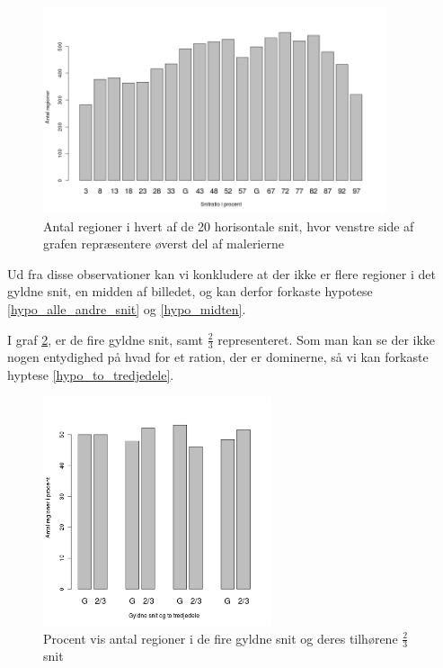 \begin{figure}[h!]
	\begin{center}
		\includegraphics[width=0.9\textwidth]{afsnit/resultater/billeder/cut2cut3eatsperratioU.png}
	\end{center}
	\caption{Antal regioner i hvert af de 20 horisontale snit, hvor venstre side af grafen repræsentere øverst del af malerierne}
	\label{antal_regioner_horisontale_cut_udvidet}
\end{figure}

Ud fra disse observationer kan vi konkludere at der ikke er flere
regioner i det gyldne snit, en midden af billedet, og kan derfor
forkaste hypotese \ref{hypo_alle_andre_snit} og \ref{hypo_midten}.

I graf \ref{G_vs_to_trejedele_udvidet}, er de fire gyldne snit, samt
$\frac{2}{3}$ representeret. Som man kan se der ikke nogen entydighed på
hvad for et ration, der er dominerne, så vi kan forkaste hyptese
\ref{hypo_to_tredjedele}.

\begin{figure}[h!]
	\begin{center}
		\includegraphics[width=0.6\textwidth]{afsnit/resultater/billeder/G_vs_to_tredjedeleU.png}
	\end{center}
	\caption{Procent vis antal regioner i de fire gyldne snit og deres tilhørene $\frac{2}{3}$ snit}
	\label{G_vs_to_trejedele_udvidet}
\end{figure}

